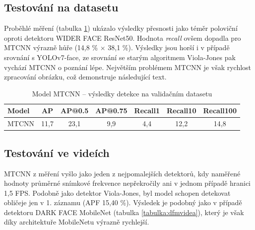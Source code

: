 \subsection*{Testování na datasetu}
Proběhlé měření (tabulka \ref{tabulka:mtcnn}) ukázalo výsledky přesnosti jako téměr poloviční oproti detektoru WIDER FACE ResNet50. Hodnota \emph{recall} ovšem dopadla pro MTCNN výrazně hůře (14,8 \% $\times$ 38,1 \%). Výsledky jsou horší i v případě srovnání s YOLOv7-face, ze srovnání se starým algoritmem Viola-Jones pak vychází MTCNN o poznání lépe. Největším problémem MTCNN je však rychlost zpracování obrázku, což demonstruje následující text.

\begin{table}[H]
  \begin{center}
    \begin{tabular}{|l|c|c|c|c|c|c|}
    \hline
    \rowcolor[HTML]{E0DBDB} 
    \textbf{Model}                & \textbf{AP} & \textbf{AP@0.5} & \textbf{AP@0.75} & \textbf{Recall1} & \textbf{Recall10} & \textbf{Recall100} \\ \hline
    \cellcolor[HTML]{E0DBDB}MTCNN & 11,7        & 23,1            & 9,9              & 4,4              & 12,2              & 14,8               \\ \hline
    \end{tabular}
    \label{tabulka:mtcnn}
    \caption{Model MTCNN -- výsledky detekce na validačním datasetu}
  \end{center}
\end{table}

\subsection*{Testování ve videích}
MTCNN z měření vyšlo jako jeden z nejpomalejších detektorů, kdy naměřené hodnoty průměrné snímkové frekvence nepřekročily ani v jednom případě hranici 1,5 FPS. Podobně jako detektor Viola-Jones, byl model schopen detekovat obličeje jen v 1. záznamu (APF 15,40 \%). Výsledek je podobný jako v případě detektoru DARK FACE MobileNet (tabulka \ref{tabulka:dfmvidea}), který je však díky architektuře MobileNetu výrazně rychlejší.

